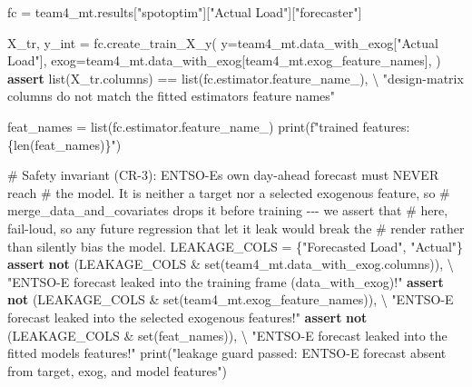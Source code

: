\documentclass[
  english,
  letterpaper,
]{scrbook}
\newenvironment{Shaded}{\begin{snugshade}}{\end{snugshade}}
\newcommand{\BuiltInTok}[1]{\textcolor[rgb]{0.00,0.23,0.31}{#1}}
\newcommand{\CommentTok}[1]{\textcolor[rgb]{0.37,0.37,0.37}{#1}}
\newcommand{\ControlFlowTok}[1]{\textcolor[rgb]{0.00,0.23,0.31}{\textbf{#1}}}
\newcommand{\KeywordTok}[1]{\textcolor[rgb]{0.00,0.23,0.31}{\textbf{#1}}}
\newcommand{\NormalTok}[1]{\textcolor[rgb]{0.00,0.23,0.31}{#1}}
\newcommand{\OperatorTok}[1]{\textcolor[rgb]{0.37,0.37,0.37}{#1}}
\newcommand{\SpecialCharTok}[1]{\textcolor[rgb]{0.37,0.37,0.37}{#1}}
\newcommand{\SpecialStringTok}[1]{\textcolor[rgb]{0.13,0.47,0.30}{#1}}
\newcommand{\StringTok}[1]{\textcolor[rgb]{0.13,0.47,0.30}{#1}}
\begin{document}
\protect{}\label{team4-load-model}
\begin{Shaded}
\begin{Highlighting}[]
\NormalTok{fc }\OperatorTok{=}\NormalTok{ team4\_mt.results[}\StringTok{"spotoptim"}\NormalTok{][}\StringTok{"Actual Load"}\NormalTok{][}\StringTok{"forecaster"}\NormalTok{]}

\NormalTok{X\_tr, y\_int }\OperatorTok{=}\NormalTok{ fc.create\_train\_X\_y(}
\NormalTok{    y}\OperatorTok{=}\NormalTok{team4\_mt.data\_with\_exog[}\StringTok{"Actual Load"}\NormalTok{],}
\NormalTok{    exog}\OperatorTok{=}\NormalTok{team4\_mt.data\_with\_exog[team4\_mt.exog\_feature\_names],}
\NormalTok{)}
\ControlFlowTok{assert} \BuiltInTok{list}\NormalTok{(X\_tr.columns) }\OperatorTok{==} \BuiltInTok{list}\NormalTok{(fc.estimator.feature\_name\_), }\OperatorTok{\textbackslash{}}
    \StringTok{"design{-}matrix columns do not match the fitted estimator\textquotesingle{}s feature names"}

\NormalTok{feat\_names }\OperatorTok{=} \BuiltInTok{list}\NormalTok{(fc.estimator.feature\_name\_)}
\BuiltInTok{print}\NormalTok{(}\SpecialStringTok{f"trained features: }\SpecialCharTok{\{}\BuiltInTok{len}\NormalTok{(feat\_names)}\SpecialCharTok{\}}\SpecialStringTok{"}\NormalTok{)}

\CommentTok{\# Safety invariant (CR{-}3): ENTSO{-}E\textquotesingle{}s own day{-}ahead forecast must NEVER reach}
\CommentTok{\# the model. It is neither a target nor a selected exogenous feature, so}
\CommentTok{\# \textasciigrave{}merge\_data\_and\_covariates\textasciigrave{} drops it before training {-}{-}{-} we assert that}
\CommentTok{\# here, fail{-}loud, so any future regression that let it leak would break the}
\CommentTok{\# render rather than silently bias the model.}
\NormalTok{LEAKAGE\_COLS }\OperatorTok{=}\NormalTok{ \{}\StringTok{"Forecasted Load"}\NormalTok{, }\StringTok{"Actual"}\NormalTok{\}}
\ControlFlowTok{assert} \KeywordTok{not}\NormalTok{ (LEAKAGE\_COLS }\OperatorTok{\&} \BuiltInTok{set}\NormalTok{(team4\_mt.data\_with\_exog.columns)), }\OperatorTok{\textbackslash{}}
    \StringTok{"ENTSO{-}E forecast leaked into the training frame (data\_with\_exog)!"}
\ControlFlowTok{assert} \KeywordTok{not}\NormalTok{ (LEAKAGE\_COLS }\OperatorTok{\&} \BuiltInTok{set}\NormalTok{(team4\_mt.exog\_feature\_names)), }\OperatorTok{\textbackslash{}}
    \StringTok{"ENTSO{-}E forecast leaked into the selected exogenous features!"}
\ControlFlowTok{assert} \KeywordTok{not}\NormalTok{ (LEAKAGE\_COLS }\OperatorTok{\&} \BuiltInTok{set}\NormalTok{(feat\_names)), }\OperatorTok{\textbackslash{}}
    \StringTok{"ENTSO{-}E forecast leaked into the fitted model\textquotesingle{}s features!"}
\BuiltInTok{print}\NormalTok{(}\StringTok{"leakage guard passed: ENTSO{-}E forecast absent from target, exog, and model features"}\NormalTok{)}


\end{Highlighting}
\end{Shaded}
\end{document}

